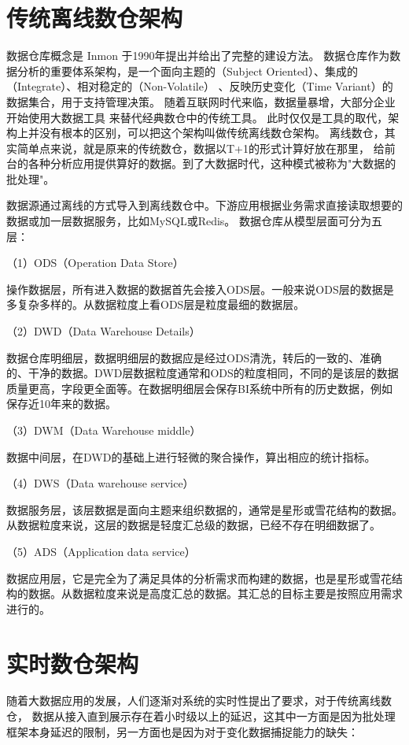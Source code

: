 \section{传统离线数仓架构}

数据仓库概念是 Inmon 于1990年提出并给出了完整的建设方法。
数据仓库作为数据分析的重要体系架构，是一个面向主题的（Subject Oriented）、集成的（Integrate）、相对稳定的（Non-Volatile）
、反映历史变化（Time Variant）的数据集合，用于支持管理决策。
随着互联网时代来临，数据量暴增，大部分企业开始使用大数据工具 来替代经典数仓中的传统工具。
此时仅仅是工具的取代，架构上并没有根本的区别，可以把这个架构叫做传统离线数仓架构。
离线数仓，其实简单点来说，就是原来的传统数仓，数据以T+1的形式计算好放在那里，
给前台的各种分析应用提供算好的数据。到了大数据时代，这种模式被称为"大数据的批处理"。

数据源通过离线的方式导入到离线数仓中。下游应用根据业务需求直接读取想要的数据或加一层数据服务，比如MySQL或Redis。
数据仓库从模型层面可分为五层：

（1）ODS（Operation Data Store）

操作数据层，所有进入数据的数据首先会接入ODS层。一般来说ODS层的数据是多复杂多样的。从数据粒度上看ODS层是粒度最细的数据层。

（2）DWD（Data Warehouse Details）

数据仓库明细层，数据明细层的数据应是经过ODS清洗，转后的一致的、准确的、干净的数据。DWD层数据粒度通常和ODS的粒度相同，不同的是该层的数据质量更高，字段更全面等。在数据明细层会保存BI系统中所有的历史数据，例如保存近10年来的数据。

（3）DWM（Data Warehouse middle）

数据中间层，在DWD的基础上进行轻微的聚合操作，算出相应的统计指标。

（4）DWS（Data warehouse service）

数据服务层，该层数据是面向主题来组织数据的，通常是星形或雪花结构的数据。从数据粒度来说，这层的数据是轻度汇总级的数据，已经不存在明细数据了。

（5）ADS（Application data service）

数据应用层，它是完全为了满足具体的分析需求而构建的数据，也是星形或雪花结构的数据。从数据粒度来说是高度汇总的数据。其汇总的目标主要是按照应用需求进行的。

\section{实时数仓架构}

随着大数据应用的发展，人们逐渐对系统的实时性提出了要求，对于传统离线数仓，
数据从接入直到展示存在着小时级以上的延迟，这其中一方面是因为批处理框架本身延迟的限制，另一方面也是因为对于变化数据捕捉能力的缺失：

